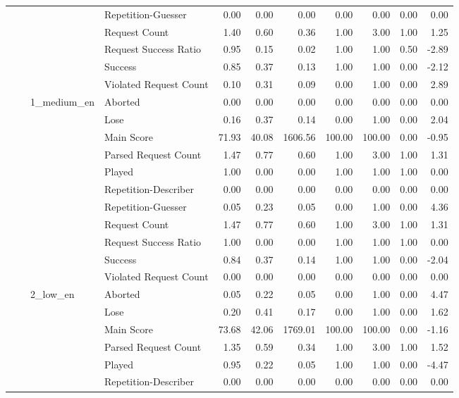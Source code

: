 \begin{tabular}{llllrrrrrrr}
 &  &  & Repetition-Guesser & 0.00 & 0.00 & 0.00 & 0.00 & 0.00 & 0.00 & 0.00 \\
 &  &  & Request Count & 1.40 & 0.60 & 0.36 & 1.00 & 3.00 & 1.00 & 1.25 \\
 &  &  & Request Success Ratio & 0.95 & 0.15 & 0.02 & 1.00 & 1.00 & 0.50 & -2.89 \\
 &  &  & Success & 0.85 & 0.37 & 0.13 & 1.00 & 1.00 & 0.00 & -2.12 \\
 &  &  & Violated Request Count & 0.10 & 0.31 & 0.09 & 0.00 & 1.00 & 0.00 & 2.89 \\
\cline{3-11}
 &  & \multirow[t]{11}{*}{1_medium_en} & Aborted & 0.00 & 0.00 & 0.00 & 0.00 & 0.00 & 0.00 & 0.00 \\
 &  &  & Lose & 0.16 & 0.37 & 0.14 & 0.00 & 1.00 & 0.00 & 2.04 \\
 &  &  & Main Score & 71.93 & 40.08 & 1606.56 & 100.00 & 100.00 & 0.00 & -0.95 \\
 &  &  & Parsed Request Count & 1.47 & 0.77 & 0.60 & 1.00 & 3.00 & 1.00 & 1.31 \\
 &  &  & Played & 1.00 & 0.00 & 0.00 & 1.00 & 1.00 & 1.00 & 0.00 \\
 &  &  & Repetition-Describer & 0.00 & 0.00 & 0.00 & 0.00 & 0.00 & 0.00 & 0.00 \\
 &  &  & Repetition-Guesser & 0.05 & 0.23 & 0.05 & 0.00 & 1.00 & 0.00 & 4.36 \\
 &  &  & Request Count & 1.47 & 0.77 & 0.60 & 1.00 & 3.00 & 1.00 & 1.31 \\
 &  &  & Request Success Ratio & 1.00 & 0.00 & 0.00 & 1.00 & 1.00 & 1.00 & 0.00 \\
 &  &  & Success & 0.84 & 0.37 & 0.14 & 1.00 & 1.00 & 0.00 & -2.04 \\
 &  &  & Violated Request Count & 0.00 & 0.00 & 0.00 & 0.00 & 0.00 & 0.00 & 0.00 \\
\cline{3-11}
 &  & \multirow[t]{11}{*}{2_low_en} & Aborted & 0.05 & 0.22 & 0.05 & 0.00 & 1.00 & 0.00 & 4.47 \\
 &  &  & Lose & 0.20 & 0.41 & 0.17 & 0.00 & 1.00 & 0.00 & 1.62 \\
 &  &  & Main Score & 73.68 & 42.06 & 1769.01 & 100.00 & 100.00 & 0.00 & -1.16 \\
 &  &  & Parsed Request Count & 1.35 & 0.59 & 0.34 & 1.00 & 3.00 & 1.00 & 1.52 \\
 &  &  & Played & 0.95 & 0.22 & 0.05 & 1.00 & 1.00 & 0.00 & -4.47 \\
 &  &  & Repetition-Describer & 0.00 & 0.00 & 0.00 & 0.00 & 0.00 & 0.00 & 0.00 \\

\end{tabular}
